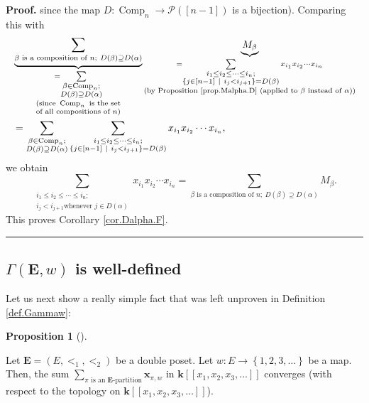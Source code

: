 \documentclass[numbers=enddot,12pt,final,onecolumn,notitlepage,abstracton]{scrartcl}
\theoremstyle{definition}
\newtheorem{prop}[theo]{Proposition}
\newenvironment{proposition}[1][]
{\begin{prop}[#1]\begin{leftbar}}
{\end{leftbar}\end{prop}}
\newenvironment{proof}[1][Proof]{\noindent\textbf{#1.} }{\ \rule{0.5em}{0.5em}}
\let\sumnonlimits\sum
\renewcommand{\sum}{\sumnonlimits\limits}
\newenvironment{verlong}{}{}
\begin{document}
\begin{verlong}
\begin{footnotesize}
\begin{proof}
since the map $D:\operatorname*{Comp}\nolimits_{n}\rightarrow\mathcal{P}%
\left(  \left[  n-1\right]  \right)  $ is a bijection). Comparing this with%
\begin{align*}
&  \underbrace{\sum_{\beta\text{ is a composition of }n;\ D\left(
\beta\right)  \supseteq D\left(  \alpha\right)  }}_{\substack{=\sum
_{\substack{\beta\in\operatorname*{Comp}\nolimits_{n};\\D\left(  \beta\right)
\supseteq D\left(  \alpha\right)  }}\\\text{(since }\operatorname*{Comp}%
\nolimits_{n}\text{ is the set}\\\text{of all compositions of }n\text{)}%
}}\underbrace{M_{\beta}}_{\substack{=\sum_{\substack{i_{1}\leq i_{2}\leq
\cdots\leq i_{n};\\\left\{  j\in\left[  n-1\right]  \ \mid\ i_{j}%
<i_{j+1}\right\}  =D\left(  \beta\right)  }}x_{i_{1}}x_{i_{2}}\cdots x_{i_{n}%
}\\\text{(by Proposition \ref{prop.Malpha.D} (applied to }\beta\text{ instead
of }\alpha\text{))}}}\\
&  =\sum_{\substack{\beta\in\operatorname*{Comp}\nolimits_{n};\\D\left(
\beta\right)  \supseteq D\left(  \alpha\right)  }}\sum_{\substack{i_{1}\leq
i_{2}\leq\cdots\leq i_{n};\\\left\{  j\in\left[  n-1\right]  \ \mid
\ i_{j}<i_{j+1}\right\}  =D\left(  \beta\right)  }}x_{i_{1}}x_{i_{2}}\cdots
x_{i_{n}},
\end{align*}
we obtain%
\[
\sum_{\substack{i_{1}\leq i_{2}\leq\cdots\leq i_{n};\\i_{j}<i_{j+1}\text{
whenever }j\in D\left(  \alpha\right)  }}x_{i_{1}}x_{i_{2}}\cdots x_{i_{n}%
}=\sum_{\beta\text{ is a composition of }n;\ D\left(  \beta\right)  \supseteq
D\left(  \alpha\right)  }M_{\beta}.
\]
This proves Corollary \ref{cor.Dalpha.F}.
\end{proof}

\subsection{$\Gamma\left(  \mathbf{E},w\right)  $ is well-defined}

Let us next show a really simple fact that was left unproven in Definition
\ref{def.Gammaw}:

\begin{proposition}
\label{prop.Gammaw.welldef}Let ${\mathbf{E}}=\left(  E,<_{1},<_{2}\right)  $
be a double poset. Let $w:E\rightarrow\left\{  1,2,3,\ldots\right\}  $ be a
map. Then, the sum $\sum_{\pi\text{ is an }{\mathbf{E}}\text{-partition}%
}{\mathbf{x}}_{\pi,w}$ in $\mathbf{k}\left[  \left[  x_{1},x_{2},x_{3}%
,\ldots\right]  \right]  $ converges (with respect to the topology on
$\mathbf{k}\left[  \left[  x_{1},x_{2},x_{3},\ldots\right]  \right]  $).
\end{proposition}


\end{footnotesize}
\end{verlong}
\end{document}
